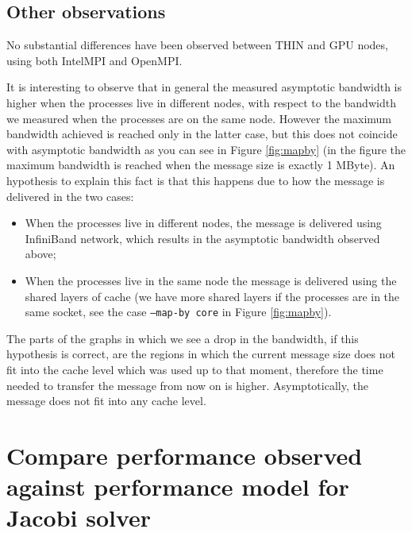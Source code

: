 \documentclass{article}
\begin{document}
\subsection{Other observations}

No substantial differences have been observed between THIN and GPU nodes, using both IntelMPI and OpenMPI.

It is interesting to observe that in general the measured asymptotic bandwidth is higher when the processes live in different nodes, with respect to the bandwidth we measured when the processes are on the same node. However the maximum bandwidth achieved is reached only in the latter case, but this does not coincide with asymptotic bandwidth as you can see in Figure \ref{fig:mapby} (in the figure the maximum bandwidth is reached when the message size is exactly 1 MByte). An hypothesis to explain this fact is that this happens due to how the message is delivered in the two cases:
\begin{itemize}
    \item When the processes live in different nodes, the message is delivered using InfiniBand network, which results in the asymptotic bandwidth observed above;
    \item When the processes live in the same node the message is delivered using the shared layers of cache (we have more shared layers if the processes are in the same socket, see the case \texttt{--map-by core} in Figure \ref{fig:mapby}).
\end{itemize}
The parts of the graphs in which we see a drop in the bandwidth, if this hypothesis is correct, are the regions in which the current message size does not fit into the cache level which was used up to that moment, therefore the time needed to transfer the message from now on is higher. Asymptotically, the message does not fit into any cache level.

\newpage
\section{Compare performance observed against performance model for Jacobi solver}
\end{document}
